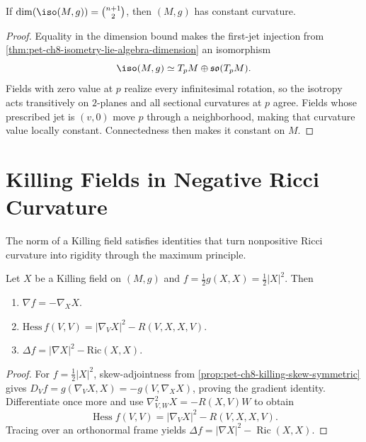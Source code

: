 \begin{theorem}
  \label{thm:pet-ch8-maximal-symmetry-constant-curvature}
  If $\dim(\iso(M,g))=\binom{n+1}2$, then $(M,g)$ has constant curvature.
\end{theorem}
\begin{proof}
  \sketch
  Equality in the dimension bound makes the first-jet injection from
  \cref{thm:pet-ch8-isometry-lie-algebra-dimension} an isomorphism
  \[
    \iso(M,g)\simeq T_pM\oplus\mathfrak{so}(T_pM).
  \]
  Fields with zero value at \(p\) realize every infinitesimal rotation, so the
  isotropy acts transitively on \(2\)-planes and all sectional curvatures at
  \(p\) agree. Fields whose prescribed jet is \((v,0)\) move \(p\) through a
  neighborhood, making that curvature value locally constant. Connectedness
  then makes it constant on \(M\).
\end{proof}

\section{Killing Fields in Negative Ricci Curvature}

The norm of a Killing field satisfies identities that turn nonpositive Ricci
curvature into rigidity through the maximum principle.

\begin{proposition}
  \label{prop:pet-ch8-killing-norm-formulas}
  Let $X$ be a Killing field on $(M,g)$ and $f=\tfrac12g(X,X)=\tfrac12|X|^2$.
  Then
  \begin{enumerate}
    \item $\nabla f=-\nabla_XX$.
    \item $\mathrm{Hess}\,f(V,V)=|\nabla_VX|^2-R(V,X,X,V)$.
    \item $\Delta f=|\nabla X|^2-\mathrm{Ric}(X,X)$.
  \end{enumerate}
\end{proposition}
\begin{proof}
  \sketch
  For \(f=\tfrac12|X|^2\), skew-adjointness from
  \cref{prop:pet-ch8-killing-skew-symmetric} gives
  \(D_Vf=g(\nabla_VX,X)=-g(V,\nabla_XX)\), proving the gradient identity.
  Differentiate once more and use
  \(\nabla^2_{V,W}X=-R(X,V)W\) to obtain
  \[
    \operatorname{Hess}f(V,V)=|\nabla_VX|^2-R(V,X,X,V).
  \]
  Tracing over an orthonormal frame yields
  \(\Delta f=|\nabla X|^2-\operatorname{Ric}(X,X)\).
\end{proof}

